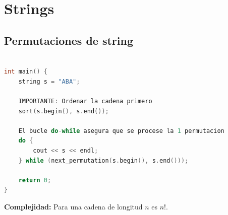 \chapter{Strings}


\section{Permutaciones de string}
\begin{lstlisting}[language=C++, caption=Next\_permutation]

int main() {
    string s = "ABA";
    
    IMPORTANTE: Ordenar la cadena primero
    sort(s.begin(), s.end()); 
    
    El bucle do-while asegura que se procese la 1 permutacion
    do {
        cout << s << endl;
    } while (next_permutation(s.begin(), s.end()));
    
    return 0;
}
\end{lstlisting}
\textbf{Complejidad:} Para una cadena de longitud $n$ es $n!$.